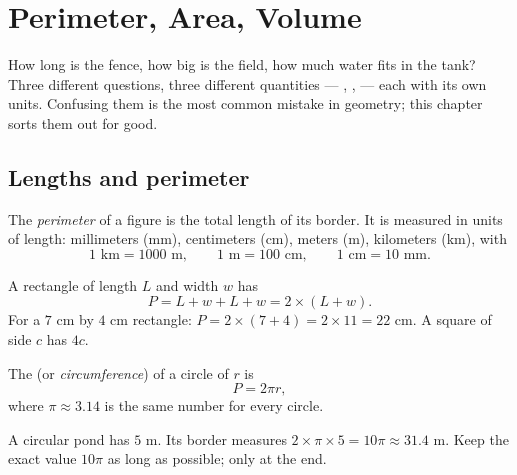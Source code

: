 \chapter{Perimeter, Area, Volume}\label{ch:g6:measure}

How long is the fence, how big is the field, how much water fits in the
tank? Three different questions, three different quantities ---
, ,  --- each with its own units. Confusing them is
the most common mistake in geometry; this chapter sorts them out for
good.

\section{Lengths and perimeter}

\begin{definition}[Perimeter]\label{def:g6:measure:perimeter}
The \emph{perimeter} of a figure is the total length
of its border. It is measured in units of length: millimeters (mm),
centimeters (cm), meters (m), kilometers (km), with
\[
1 \text{ km} = 1000 \text{ m}, \qquad
1 \text{ m} = 100 \text{ cm}, \qquad
1 \text{ cm} = 10 \text{ mm}.
\]
\end{definition}

\begin{example}\label{ex:g6:measure:perimeter}
A rectangle of length $L$ and width $w$ has 
\[
P = L + w + L + w = 2 \times (L + w).
\]
For a $7$ cm by $4$ cm rectangle: $P = 2 \times (7 + 4) = 2 \times 11 =
22$ cm. A square of side $c$ has  $4c$.
\end{example}

\begin{proposition}\label{prop:g6:measure:circle}
The  (or \emph{circumference}) of a circle of  $r$ is
\[
P = 2 \pi r ,
\]
where $\pi \approx 3.14$ is the same number for every circle.
\end{proposition}
\admitted

\begin{example}
A circular pond has  $5$ m. Its border measures
$2 \times \pi \times 5 = 10\pi \approx 31.4$ m. Keep the exact value
$10\pi$ as long as possible;  only at the end.
\end{example}

